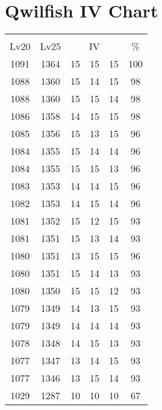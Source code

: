 \documentclass{article}%
\begin{document}
%
\normalsize%
\section{Qwilfish IV Chart}%
\label{sec:Qwilfish IV Chart}%
\renewcommand{\arraystretch}{1.5}%
\begin{tabular}{|c|c|c|c|c|c|}%
\hline%
\multicolumn{6}{|c|}{\textcolor{white}{ 
\linebreak{Qwilfish}
}%
\cellcolor{black}}\\%
\multicolumn{1}{|c}{Lv20}&\multicolumn{1}{c|}{Lv25}&\multicolumn{3}{c|}{IV}&\multicolumn{1}{|c|}{\%}\\%
\hline%
\rowcolor{color100}%
1091&1364&15&15&15&100\\%
\hline%
\rowcolor{color98}%
1088&1360&15&14&15&98\\%
\hline%
\rowcolor{color98}%
1088&1360&15&15&14&98\\%
\hline%
\rowcolor{color98}%
1086&1358&14&15&15&98\\%
\hline%
\rowcolor{color96}%
1085&1356&15&13&15&96\\%
\hline%
\rowcolor{color96}%
1084&1355&15&14&14&96\\%
\hline%
\rowcolor{color96}%
1084&1355&15&15&13&96\\%
\hline%
\rowcolor{color96}%
1083&1353&14&14&15&96\\%
\hline%
\rowcolor{color96}%
1082&1353&14&15&14&96\\%
\hline%
\rowcolor{color93}%
1081&1352&15&12&15&93\\%
\hline%
\rowcolor{color93}%
1081&1351&15&13&14&93\\%
\hline%
\rowcolor{color96}%
1080&1351&13&15&15&96\\%
\hline%
\rowcolor{color93}%
1080&1351&15&14&13&93\\%
\hline%
\rowcolor{color93}%
1080&1350&15&15&12&93\\%
\hline%
\rowcolor{color93}%
1079&1349&14&13&15&93\\%
\hline%
\rowcolor{color93}%
1079&1349&14&14&14&93\\%
\hline%
\rowcolor{color93}%
1078&1348&14&15&13&93\\%
\hline%
\rowcolor{color93}%
1077&1347&13&14&15&93\\%
\hline%
\rowcolor{color93}%
1077&1346&13&15&14&93\\%
\hline%
\rowcolor{color91}%
1029&1287&10&10&10&67\\%
\end{tabular}

%
\end{document}
